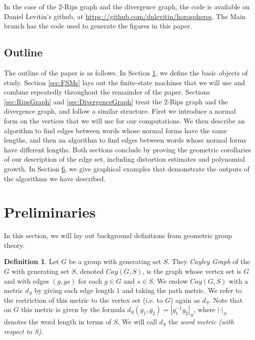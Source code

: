 \documentclass[10pt,a4paper]{amsart}
\theoremstyle{definition}
\newtheorem{definition}[theorem]{Definition}
\theoremstyle{remark}
\begin{document}
	In the case of the 2-Rips graph and the divergence graph, the code is available on Daniel Levitin's github, at \url{https://github.com/dnlevitin/horospheres}. The Main branch has the code used to generate the figures in this paper.
	
    \subsection*{Outline}

    The outline of the paper is as follows. In Section \ref{sec:preliminaries}, we define the basic objects of study. Section \ref{sec:FSMs} lays out the finite-state machines that we will use and combine repeatedly throughout the remainder of the paper. Sections \ref{sec:RipsGraph} and \ref{sec:DivergenceGraph} treat the $2$-Rips graph and the divergence graph, and follow a similar structure. First we introduce a normal form on the vertices that we will use for our computations. We then describe an algorithm to find edges between words whose normal forms have the same lengths, and then an algorithm to find edges between words whose normal forms have different lengths. Both sections conclude by proving the geometric corollaries of our description of the edge set, including distortion estimates and polynomial growth. In Section \href{https://arxiv.org/abs/2406.18774v2}{6}, we give graphical examples that demonstrate the outputs of the algorithms we have described.
	
	\section{Preliminaries}
	\label{sec:preliminaries}

	In this section, we will lay out background definitions from geometric group theory.
	
	\begin{definition}
		
		Let $G$ be a group with generating set $S$. They \textit{Cayley Graph} of the $G$ with generating set $S$, denoted $Cay(G,S)$, is the graph whose vertex set is $G$ and with edges $(g,gs)$ for each $g\in G$ and $s\in S$. We endow $Cay(G,S)$ with a metric $d_S$ by giving each edge length $1$ and taking the path metric. We refer to the restriction of this metric to the vertex set (i.e. to $G$) again as $d_S$. Note that on $G$ this metric is given by the formula $d_S(g_1,g_2)=|g_1^{-1}g_2|_S$, where $|\cdot|_S$ denotes the word length in terms of $S$. We will call $d_S$ the \textit{word metric (with respect to S)}.
		
	\end{definition}
	
\end{document}

